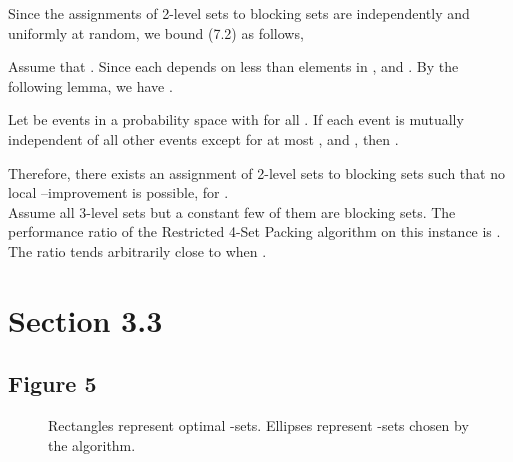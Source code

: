 \documentclass[runningheads,a4paper]{llncs}
\numberwithin{equation}{section}
\begin{document}
Since the assignments of 2-level sets to blocking sets are independently and uniformly at random, we bound (7.2) as follows,



Assume that . Since each  depends on less than  elements in , and . By the following lemma, we have .

\begin{lemma}
Let  be events in a probability space with  for all . If each event is mutually independent of all other events except for at most , and , then .
\end{lemma}

Therefore, there exists an assignment of 2-level sets to blocking sets such that no local --improvement is possible, for . \\

Assume all 3-level sets but a constant few of them are blocking sets. The performance ratio of the Restricted 4-Set Packing algorithm on this instance is . The ratio tends arbitrarily close to  when .



\section{Section 3.3}

\subsection{Figure 5}

\begin{figure}
\begin{center}
\caption{Rectangles represent optimal -sets. Ellipses represent -sets chosen by the algorithm.}
\end{center}
\end{figure}
\end{document}
